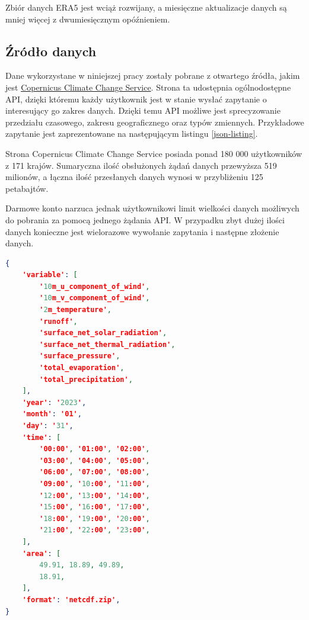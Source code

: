 Zbiór danych ERA5 jest wciąż rozwijany, a miesięczne aktualizacje danych są mniej więcej
z dwumiesięcznym opóźnieniem.

\subsection{Źródło danych}

Dane wykorzystane w niniejszej pracy zostały pobrane z otwartego źródła, jakim jest
\href{https://cds.climate.copernicus.eu/cdsapp#!/dataset/reanalysis-era5-land?tab=form}{Copernicus Climate Change Service}.
Strona ta udostępnia ogólnodostępne API, dzięki któremu każdy użytkownik jest w stanie
wysłać zapytanie o interesujący go zakres danych. Dzięki temu API możliwe jest sprecyzowanie
przedziału czasowego, zakresu geograficznego oraz typów zmiennych. Przykładowe zapytanie jest 
zaprezentowane na następującym listingu \ref{json-listing}.

Strona Copernicus Climate Change Service posiada ponad 180 000 użytkowników z 171 krajów. Sumaryczna
ilość obsłużonych żądań danych przewyższa 519 milionów, a łączna ilość przesłanych danych wynosi
w przybliżeniu 125 petabajtów.

Darmowe konto narzuca jednak użytkownikowi limit wielkości danych możliwych do pobrania 
za pomocą jednego żądania API. W przypadku zbyt dużej ilości danych konieczne
jest wielorazowe wywołanie zapytania i następne złożenie danych.

\begin{lstlisting}[label=json-listing,caption={Przykładowe zapytanie API CDS Climate Copernicus},language=json]
{
    'variable': [
        '10m_u_component_of_wind', 
        '10m_v_component_of_wind', 
        '2m_temperature',
        'runoff', 
        'surface_net_solar_radiation', 
        'surface_net_thermal_radiation',
        'surface_pressure', 
        'total_evaporation', 
        'total_precipitation',
    ],
    'year': '2023',
    'month': '01',
    'day': '31',
    'time': [
        '00:00', '01:00', '02:00',
        '03:00', '04:00', '05:00',
        '06:00', '07:00', '08:00',
        '09:00', '10:00', '11:00',
        '12:00', '13:00', '14:00',
        '15:00', '16:00', '17:00',
        '18:00', '19:00', '20:00',
        '21:00', '22:00', '23:00',
    ],
    'area': [
        49.91, 18.89, 49.89,
        18.91,
    ],
    'format': 'netcdf.zip',
}
\end{lstlisting}

